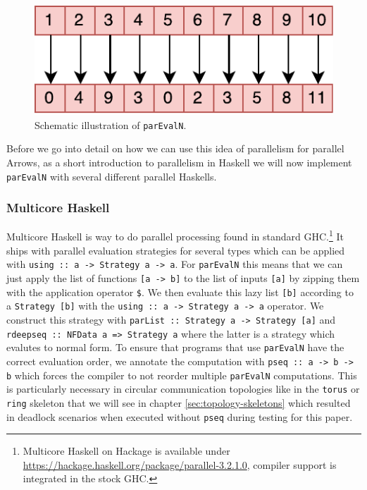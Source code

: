 \documentclass{jfp1}
\renewcommand{\cite}[1]{\citep{#1}}
\newcommand{\inlinecode}[1]{\texttt{#1}}
\begin{document}
\begin{figure}[h]
  \centering
	\includegraphics[scale=0.7]{images/parEvalN}
	\caption{Schematic illustration of \texttt{parEvalN}.}
	\label{fig:parEvalN}
\end{figure}

Before we go into detail on how we can use this idea of parallelism for parallel Arrows, as a short introduction to parallelism in Haskell we will now implement \inlinecode{parEvalN} with several different parallel Haskells.

\subsubsection{Multicore Haskell}
Multicore Haskell \cite{Marlow2009,Trinder1999} is way to do parallel processing found in standard GHC.\footnote{Multicore Haskell on Hackage is available under \url{https://hackage.haskell.org/package/parallel-3.2.1.0}, compiler support is integrated in the stock GHC.} It ships with parallel evaluation strategies \cite{Trinder1998a,Marlow2010} for several types which can be applied with \inlinecode{using :: a -> Strategy a -> a}. For \inlinecode{parEvalN} this means that we can just apply the list of functions \inlinecode{[a -> b]} to the list of inputs \inlinecode{[a]} by zipping them with the application operator \inlinecode{\$}. We then evaluate this lazy list \inlinecode{[b]} according to a \inlinecode{Strategy [b]} with the \inlinecode{using :: a -> Strategy a -> a} operator. We construct this strategy with \inlinecode{parList :: Strategy a -> Strategy [a]} and \inlinecode{rdeepseq :: NFData a => Strategy a} where the latter is a strategy which evalutes to normal form. To ensure that programs that use \inlinecode{parEvalN} have the correct evaluation order, we annotate the computation with \inlinecode{pseq :: a -> b -> b} which forces the compiler to not reorder multiple \inlinecode{parEvalN} computations. This is particularly necessary in circular communication topologies like in the \inlinecode{torus} or \inlinecode{ring} skeleton that we will see in chapter \ref{sec:topology-skeletons} which resulted in deadlock scenarios when executed without \inlinecode{pseq} during testing for this paper.
\end{document}

